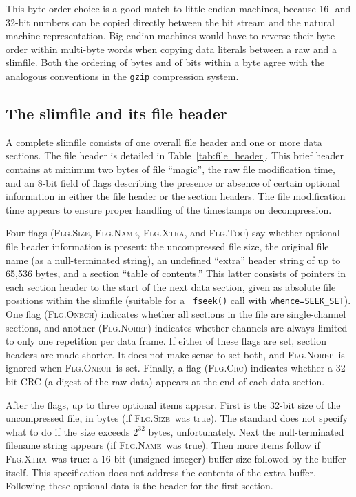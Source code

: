 \documentclass[11pt]{article}
\newcommand{\FLGTOC}{\textsc{Flg.Toc}}
\newcommand{\FLGCRC}{\textsc{Flg.Crc}}
\newcommand{\FLGSIZE}{\textsc{Flg.Size}}
\newcommand{\FLGXTRA}{\textsc{Flg.Xtra}}
\newcommand{\FLGNAME}{\textsc{Flg.Name}}
\newcommand{\FLGONECH}{\textsc{Flg.Onech}}
\newcommand{\FLGNOREP}{\textsc{Flg.Norep}}
\begin{document}
This byte-order choice is a good match to little-endian machines,
because 16- and 32-bit numbers can be copied directly between the bit
stream and the natural machine representation.  Big-endian machines
would have to reverse their byte order within multi-byte words when
copying data literals between a raw and a slimfile.  Both the ordering
of bytes and of bits within a byte agree with the analogous
conventions in the {\tt gzip} compression system.



\subsection{The slimfile and its file header}

A complete slimfile consists of one overall file header and one or
more data sections.  The file header is detailed in
Table~\ref{tab:file_header}.  This brief header contains at minimum
two bytes of file ``magic'', the raw file modification time, and an
8-bit field of flags describing the presence or absence of certain
optional information in either the file header or the section headers.
The file modification time appears to ensure proper handling of the
timestamps on decompression.

Four flags (\FLGSIZE, \FLGNAME, \FLGXTRA, and \FLGTOC) say whether
optional file header information is present: the uncompressed file
size, the original file name (as a null-terminated string), an
undefined ``extra'' header string of up to 65,536 bytes, and a section
``table of contents.''  This latter consists of pointers in each
section header to the start of the next data section, given as
absolute file positions within the slimfile (suitable for a {\tt
fseek()} call with {\tt whence=SEEK\_SET}).  One flag (\FLGONECH)
indicates whether all sections in the file are single-channel
sections, and another (\FLGNOREP) indicates whether channels are always
limited to only one repetition per data frame.  If either of these
flags are set, section headers are made shorter.  It does not make
sense to set both, and \FLGNOREP\ is ignored when \FLGONECH\ is set.  Finally, a
flag (\FLGCRC) indicates whether a 32-bit CRC (a digest of the raw data)
appears at the end of each data section.

After the flags, up to three optional items appear.  First is the
32-bit size of the uncompressed file, in bytes (if \FLGSIZE\  was true).
The standard does not specify what to do if the size exceeds $2^{32}$
bytes, unfortunately.  Next the null-terminated filename string
appears (if \FLGNAME\ was true).  Then more items follow if
\FLGXTRA\ was true: a 16-bit (unsigned integer) buffer size followed by
the buffer itself.  This specification does not address the contents
of the extra buffer.  Following these optional data is the header for
the first section.
\end{document}
